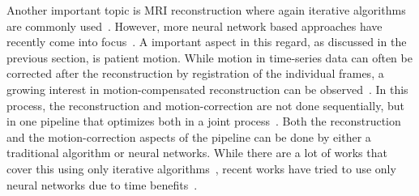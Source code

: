 Another important topic is MRI reconstruction where again iterative algorithms are commonly used~\cite{AdvancesPI,CS-MRI,ParallelMRI,GRAPPA}. However, more neural network based approaches have recently come into focus~\cite{DeepMRIReconstructionSubsampling, DeepMRIReconstructionRadialSubsampling}. A important aspect in this regard, as discussed in the previous section, is patient motion. While motion in time-series data can often be corrected after the reconstruction by registration of the individual frames, a growing interest in motion-compensated reconstruction can be observed~\cite{Oksuz2020}. In this process, the reconstruction and motion-correction are not done sequentially, but in one pipeline that optimizes both in a joint process~\cite{Kuestner2022}. Both the reconstruction and the motion-correction aspects of the pipeline can be done by either a traditional algorithm or neural networks. While there are a lot of works that cover this using only iterative algorithms~\cite{GRICS}, recent works have tried to use only neural networks due to time benefits~\cite{Pan2024,Zou2024}.



